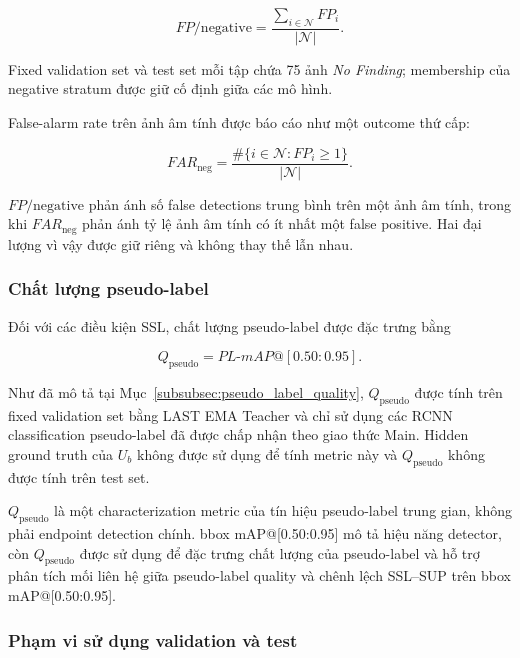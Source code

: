 \documentclass[pdflatex,sn-mathphys-num]{sn-jnl}%
\theoremstyle{thmstyleone}%
\theoremstyle{thmstyletwo}%
\theoremstyle{thmstylethree}%
\begin{document}
\begin{equation}
FP/\mathrm{negative}
=
\frac{\sum_{i\in\mathcal{N}}FP_i}
{|\mathcal{N}|}.
\label{eq:fp_per_negative}
\end{equation}

Fixed validation set và test set mỗi tập chứa 75 ảnh
\textit{No Finding}; membership của negative stratum được giữ cố định giữa
các mô hình.

False-alarm rate trên ảnh âm tính được báo cáo như một outcome thứ cấp:

\begin{equation}
FAR_{\mathrm{neg}}
=
\frac{
\#\{i\in\mathcal{N}:FP_i\geq1\}
}
{|\mathcal{N}|}.
\label{eq:negative_far}
\end{equation}

\(FP/\mathrm{negative}\) phản ánh số false detections trung bình trên một
ảnh âm tính, trong khi \(FAR_{\mathrm{neg}}\) phản ánh tỷ lệ ảnh âm tính
có ít nhất một false positive. Hai đại lượng vì vậy được giữ riêng và
không thay thế lẫn nhau.

\subsubsection{Chất lượng pseudo-label}
\label{subsubsec:qpseudo_evaluation}

Đối với các điều kiện SSL, chất lượng pseudo-label được đặc trưng bằng

\begin{equation}
Q_{\mathrm{pseudo}}
=
PL\text{-}mAP@[0.50:0.95].
\label{eq:qpseudo_evaluation_metric}
\end{equation}

Như đã mô tả tại Mục~\ref{subsubsec:pseudo_label_quality},
\(Q_{\mathrm{pseudo}}\) được tính trên fixed validation set bằng LAST EMA
Teacher và chỉ sử dụng các RCNN classification pseudo-label đã được chấp
nhận theo giao thức Main. Hidden ground truth của \(U_b\) không được sử
dụng để tính metric này và \(Q_{\mathrm{pseudo}}\) không được tính trên
test set.

\(Q_{\mathrm{pseudo}}\) là một characterization metric của tín hiệu
pseudo-label trung gian, không phải endpoint detection chính. bbox
mAP@[0.50:0.95] mô tả hiệu năng detector, còn \(Q_{\mathrm{pseudo}}\)
được sử dụng để đặc trưng chất lượng của pseudo-label và hỗ trợ phân tích
mối liên hệ giữa pseudo-label quality và chênh lệch SSL--SUP trên bbox mAP@[0.50:0.95].

\subsubsection{Phạm vi sử dụng validation và test}
\label{subsubsec:test_firewall}
\end{document}

